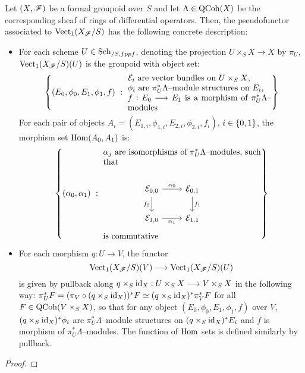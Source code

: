 \documentclass[11pt]{amsart}
\begin{document}
\begin{thm}\label{thm:Vect1-form-grpd-psfunctor}
Let $(X, \mathscr{F})$ be a formal groupoid over $S$ and let
$\Lambda \in \mathrm{QCoh}(X)$ be the corresponding sheaf of rings of differential
operators. Then, the pseudofunctor associated to $\mathrm{Vect}_1(X_\mathscr{F}/S)$ has the
following concrete description:
\begin{itemize}
\item For each scheme $U \in \mathrm{Sch}_{/S, fppf}$, denoting
the projection $U \times_S X \to X$ by $\pi_U$,
$\mathrm{Vect}_1(X_\mathscr{F}/S)(U)$ is the groupoid with object set:
\[
\set[{(E_0, \phi_0, E_1, \phi_1, f)}]{
  \parbox{0.5\textwidth}{
  $\mc{E}_i$ are vector bundles on $U \times_S X$, \\
  $\phi_i$ are $\pi_U^*\Lambda$--module structures on $E_i$, \\
  $f : E_0 \to E_1$ is a morphism of $\pi_U^*\Lambda$--modules
  }
}
\]
For each pair of objects
$A_i = (E_{1, i}, \phi_{1, i}, E_{2, i}, \phi_{2, i}, f_i)$, $i \in \set{0, 1}$,
the morphism set $\mathrm{Hom}(A_0, A_1)$ is:
\[
\set[{(\alpha_0, \alpha_1)}]{
  \parbox{0.55\textwidth}{
    $\alpha_j$ are isomorphisms of $\pi_U^*\Lambda$--modules, such that\\
    \begin{center}
    \begin{tikzcd}[ampersand replacement=\&]
      \mc{E}_{0, 0} \ar[r, "\alpha_0" above] \ar[d, "f_2" left] \&
      \mc{E}_{0, 1} \ar[d, "f_1"] \\
      \mc{E}_{1, 0} \ar[r, "\alpha_1" below] \&
      \mc{E}_{1, 1} \&
    \end{tikzcd}
    \end{center}
    is commutative
  }
}
\]

\item For each morphism $q : U \to V$, the functor
\[
\Vect_1(X_\sF/S)(V) \to \Vect_1(X_\sF/S)(U)
\]
is given by pullback along $q \times_S \id_X : U \times_S X \to V \times_S X$
in the following way:
$\pi_U^*F = (\pi_V \circ (q \times_S \mathrm{id}_X))^*F
\simeq (q \times_S \mathrm{id}_X)^*\pi_V^*F$ for all $F \in \mathrm{QCoh}(V \times_S X)$,
so that for any object $(E_0, \phi_0, E_1, \phi_1, f)$ over $V$,
$(q \times_S \mathrm{id}_X)^*\phi_i$ are $\pi_U^*\Lambda$--module structures on
$(q \times_S \mathrm{id}_X)^*E_i$ and $f$ is morphism of $\pi_U^*\Lambda$--modules.
The function of $\mathrm{Hom}$ sets is defined similarly by pullback.
\end{itemize}
\end{thm}
\begin{proof}
\end{proof}
\end{document}

